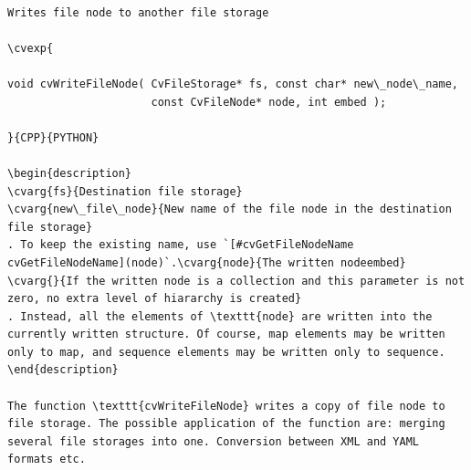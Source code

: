 \begin{verbatim}

Writes file node to another file storage

\cvexp{

void cvWriteFileNode( CvFileStorage* fs, const char* new\_node\_name,
                      const CvFileNode* node, int embed );

}{CPP}{PYTHON}

\begin{description}
\cvarg{fs}{Destination file storage}
\cvarg{new\_file\_node}{New name of the file node in the destination file storage}
. To keep the existing name, use `[#cvGetFileNodeName cvGetFileNodeName](node)`.\cvarg{node}{The written nodeembed}
\cvarg{}{If the written node is a collection and this parameter is not zero, no extra level of hiararchy is created}
. Instead, all the elements of \texttt{node} are written into the currently written structure. Of course, map elements may be written only to map, and sequence elements may be written only to sequence.
\end{description}

The function \texttt{cvWriteFileNode} writes a copy of file node to file storage. The possible application of the function are: merging several file storages into one. Conversion between XML and YAML formats etc.


\end{verbatim}
